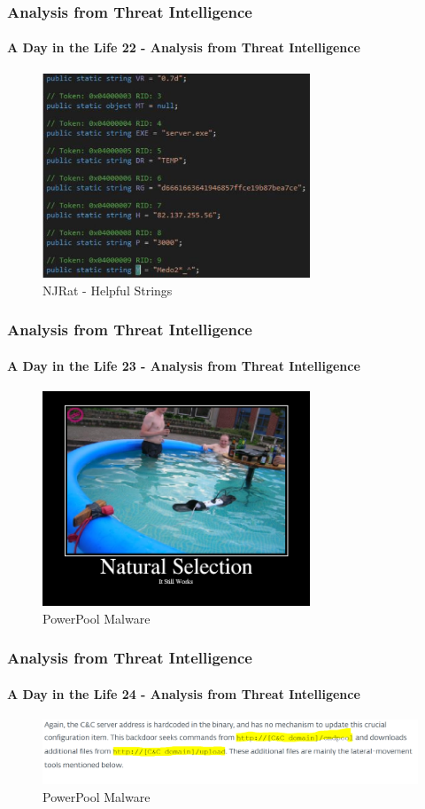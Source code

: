 \documentclass[aspectratio=169]{beamer}
\begin{document}
\begin{frame}
  \frametitle{Analysis from Threat Intelligence}
  \framesubtitle{A Day in the Life 22 - Analysis from Threat Intelligence}
  \begin{center}
    \begin{figure}
      \includegraphics[width=8cm,keepaspectratio]{njrat_strings}
      \caption{NJRat - Helpful Strings}
    \end{figure}
  \end{center}
\end{frame}

\begin{frame}
  \frametitle{Analysis from Threat Intelligence}
  \framesubtitle{A Day in the Life 23 - Analysis from Threat Intelligence}
  \begin{center}
    \begin{figure}
      \includegraphics[width=8cm,keepaspectratio]{powerpool_meme}
      \caption{PowerPool Malware}
    \end{figure}
  \end{center}
\end{frame}

\begin{frame}
  \frametitle{Analysis from Threat Intelligence}
  \framesubtitle{A Day in the Life 24 - Analysis from Threat Intelligence}
  \begin{center}
    \begin{figure}
      \includegraphics[width=14cm,keepaspectratio]{powerpool_article}
      \caption{PowerPool Malware}
    \end{figure}
  \end{center}
\end{frame}
\end{document}

